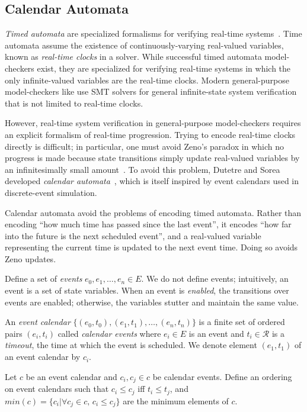 \documentclass{IEEEtran/IEEEtran}
\newcommand{\lee}[1]{ } %
\newcommand{\lee}[1]{ {\color{blue}$<$lee: #1$>$} } %
\begin{document}
\subsection{Calendar Automata}\label{sec:calendar}
\emph{Timed automata} are specialized formalisms for verifying real-time systems~\cite{}. Time automata assume the existence of continuously-varying real-valued variables, known as \emph{real-time clocks} in a solver. While successful timed automata model-checkers exist, they are specialized for verifying real-time systems in which the only infinite-valued variables are the real-time clocks. Modern general-purpose model-checkers like \lee{name some} use SMT solvers for general infinite-state system verification that is not limited to real-time clocks.

However, real-time system verification in general-purpose model-checkers requires an explicit formalism of real-time progression. Trying to encode real-time clocks directly is difficult; in particular, one must avoid Zeno's paradox in which no progress is made because state transitions simply update real-valued variables by an infinitesimally small amount~\cite{bruno,lamport}. To avoid this problem, Dutetre and Sorea developed \emph{calendar automata}~\cite{bruno}, which is itself inspired by event calendars used in discrete-event simulation.

Calendar automata avoid the problems of encoding timed automata. Rather than encoding ``how much time has passed since the last event'', it encodes ``how far into the future is the next scheduled event'', and a real-valued variable representing the current time is updated to the next event time. Doing so avoids Zeno updates.

Define a set of \emph{events} $e_0, e_1, \ldots, e_n \in E$. We do not define events; intuitively, an event is a set of state variables. When an event is \emph{enabled}, the transitions over events are enabled; otherwise, the variables stutter and maintain the same value.

An \emph{event calendar} $\{ (e_0, t_0), (e_1, t_1), \ldots, (e_n, t_n) \}$ is a finite set of ordered pairs $(e_i, t_i)$ called \emph{calendar events} where $e_i \in E$ is an event and $t_i \in \mathcal{R}$ is a \emph{timeout}, the time at which the event is scheduled. We denote element $(e_1, t_1)$ of an event calendar by $c_i$.

Let $c$ be an event calendar and $c_i, c_j \in c$ be calendar events. Define an ordering on event calendars such that $c_i \leq c_j$ iff $t_i \leq t_j$, and $min(c) = \{ c_i | \forall c_j \in c, \, c_i \leq c_j  \}$ are the minimum elements of $c$.
\end{document}
